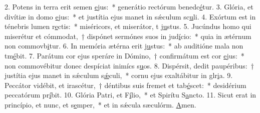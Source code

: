 2. Potens in terra erit semen \uline{e}jus:~* generátio rectórum benedc\uline{é}tur.
3. Glória, et divítiæ in domo \uline{e}jus:~* et justítia ejus manet in sǽculum sc\uline{u}li.
4. Exórtum est in ténebris lumen r\uline{e}ctis:~* miséricors, et miserátor, t j\uline{u}stus.
5. Jucúndus homo qui miserétur et cómmodat,~† dispónet sermónes suos in jud\uline{í}cio:~* quia in ætérnum non commovb\uline{i}tur.
6. In memória ætérna erit j\uline{u}stus:~* ab auditióne mala non tm\uline{é}bit.
7. Parátum cor ejus speráre in Dómino,~† confirmátum est cor \uline{e}jus:~* non commovébitur donec despíciat inimícs s\uline{u}os.
8. Dispérsit, dedit paupéribus:~† justítia ejus manet in sǽculum s\uline{ǽ}culi,~* cornu ejus exaltábitur in glr\uline{i}a.
9. Peccátor vidébit, et irascétur,~† déntibus suis fremet et tab\uline{é}scet:~* desidérium peccatórum pr\uline{í}bit.
10. Glória Patri, et F\uline{í}lio,~* et Spirítu S\uline{a}ncto.
11. Sicut erat in princípio, et nunc, et s\uline{e}mper,~* et in sǽcula sæculórm. \uline{A}men.
